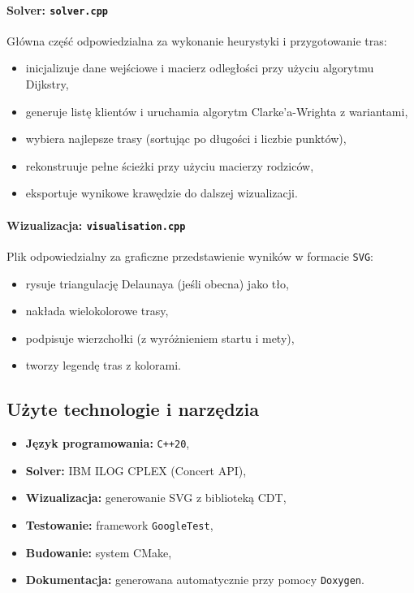 \documentclass{article}
\begin{document}
\paragraph{Solver: \texttt{solver.cpp}}

Główna część odpowiedzialna za wykonanie heurystyki i przygotowanie tras:
\begin{itemize}
    \item inicjalizuje dane wejściowe i macierz odległości przy użyciu algorytmu Dijkstry,
    \item generuje listę klientów i uruchamia algorytm Clarke’a-Wrighta z wariantami,
    \item wybiera najlepsze trasy (sortując po długości i liczbie punktów),
    \item rekonstruuje pełne ścieżki przy użyciu macierzy rodziców,
    \item eksportuje wynikowe krawędzie do dalszej wizualizacji.
\end{itemize}

\paragraph{Wizualizacja: \texttt{visualisation.cpp}}

Plik odpowiedzialny za graficzne przedstawienie wyników w formacie \texttt{SVG}:
\begin{itemize}
    \item rysuje triangulację Delaunaya (jeśli obecna) jako tło,
    \item nakłada wielokolorowe trasy,
    \item podpisuje wierzchołki (z wyróżnieniem startu i mety),
    \item tworzy legendę tras z kolorami.
\end{itemize}

\subsection*{Użyte technologie i narzędzia}

\begin{itemize}
    \item \textbf{Język programowania:} \texttt{C++20},
    \item \textbf{Solver:} IBM ILOG CPLEX (Concert API),
    \item \textbf{Wizualizacja:} generowanie SVG z biblioteką CDT,
    \item \textbf{Testowanie:} framework \texttt{GoogleTest},
    \item \textbf{Budowanie:} system CMake,
    \item \textbf{Dokumentacja:} generowana automatycznie przy pomocy \texttt{Doxygen}.
\end{itemize}
\end{document}
